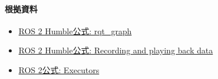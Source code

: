 \documentclass[a4paper,11pt]{article}
\begin{document}
\paragraph{根拠資料}
\begin{itemize}[leftmargin=1.6em]
\item \href{https://docs.ros.org/en/ros2_packages/humble/api/rqt_graph/index.html}{ROS 2 Humble公式: rqt\_graph}
\item \href{https://docs.ros.org/en/humble/Tutorials/Beginner-CLI-Tools/Recording-And-Playing-Back-Data/Recording-And-Playing-Back-Data.html}{ROS 2 Humble公式: Recording and playing back data}
\item \href{https://docs.ros.org/en/rolling/Concepts/Intermediate/About-Executors.html}{ROS 2公式: Executors}
\end{itemize}

                
\end{document}
